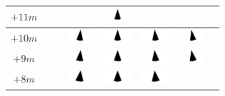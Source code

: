 \begin{tabular}{|c|c|c|c|c|c|c|c|}
	\hline
	$+11m$ & & & &
	\includegraphics[width=1cm]{img_Bereich/V1_vid_res_Winkel_X_0_11000.png}& & &\\ 
	\hline 
	$+10m$ & & &
	\includegraphics[width=1cm]{img_Bereich/V1_vid_res_Winkel_X_-1000_10000.png}&
	\includegraphics[width=1cm]{img_Bereich/V1_vid_res_Winkel_X_0_10000.png}&
	\includegraphics[width=1cm]{img_Bereich/V1_vid_res_Winkel_X_1000_10000.png}&
	\includegraphics[width=1cm]{img_Bereich/V1_vid_res_Winkel_X_2000_10000.png}&\\ 
	\hline 
	$+9m$ & & &
	\includegraphics[width=1cm]{img_Bereich/V1_vid_res_Winkel_X_-1000_9000.png}&
	\includegraphics[width=1cm]{img_Bereich/V1_vid_res_Winkel_X_0_9000.png}&
	\includegraphics[width=1cm]{img_Bereich/V1_vid_res_Winkel_X_1000_9000.png}&
	\includegraphics[width=1cm]{img_Bereich/V1_vid_res_Winkel_X_2000_9000.png}&\\ 
	\hline 
	$+8m$ & & &
	\includegraphics[width=1cm]{img_Bereich/V1_vid_res_Winkel_X_-1000_8000.png}&
	\includegraphics[width=1cm]{img_Bereich/V1_vid_res_Winkel_X_0_8000.png}&
	\includegraphics[width=1cm]{img_Bereich/V1_vid_res_Winkel_X_1000_8000.png}& & \\ 

\end{tabular}
